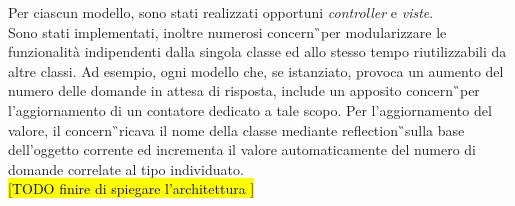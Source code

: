Per ciascun modello, sono stati realizzati opportuni \textit{controller} e \textit{viste}. \\
Sono stati implementati, inoltre numerosi \gls{concern}\G\ per modularizzare le funzionalità indipendenti dalla singola classe ed allo stesso tempo riutilizzabili da altre classi. Ad esempio, ogni modello che, se istanziato, provoca un aumento del numero delle domande in attesa di risposta, include un apposito \gls{concern}\G\ per l'aggiornamento di un contatore dedicato a tale scopo. Per l'aggiornamento del valore, il \gls{concern}\G\ ricava il nome della classe mediante \gls{reflection}\G\ sulla base dell'oggetto corrente ed incrementa il valore automaticamente del numero di domande correlate al tipo individuato.\\
\hl{[TODO finire di spiegare l'architettura ]}\\


